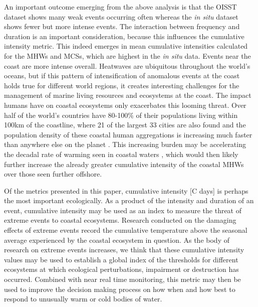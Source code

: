 \documentclass[a4paper,10pt,review]{elsarticle}
\begin{document}
An important outcome emerging from the above analysis is that the OISST dataset shows many weak events occurring often whereas the \emph{in situ} dataset shows fewer but more intense events. The interaction between frequency and duration is an important consideration, because this influences the cumulative intensity metric. This indeed emerges in mean cumulative intensities calculated for the MHWs and MCSs, which are highest in the \emph{in situ} data. Events near the coast are more intense overall. Heatwaves are ubiquitous throughout the world's oceans, but if this pattern of intensification of anomalous events at the coast holds true for different world regions, it creates interesting challenges for the management of marine living resources and ecosystems at the coast. The impact humans have on coastal ecosystems only exacerbates this looming threat. Over half of the world's countries have 80-100\% of their populations living within 100km of the coastline, where 21 of the largest 33 cities are also found and the population density of these coastal human aggregations is increasing much faster than anywhere else on the planet \citep{Martinez2007}. This increasing burden may be accelerating the decadal rate of warming seen in coastal waters \citep{Amos2013}, which would then likely further increase the already greater cumulative intensity of the coastal MHWs over those seen further offshore.

Of the metrics presented in this paper, cumulative intensity [\degree C days] is perhaps the most important ecologically. As a product of the intensity and duration of an event, cumulative intensity may be used as an index to measure the threat of extreme events to coastal ecosystems. Research conducted on the damaging effects of extreme events \citep[e.g.][]{Wernberg2013} record the cumulative temperature above the seasonal average experienced by the coastal ecosystem in question. As the body of research on extreme events increases, we think that these cumulative intensity values may be used to establish a global index of the thresholds for different ecosystems at which ecological perturbations, impairment or destruction has occurred. Combined with near real time monitoring, this metric may then be used to improve the decision making process on how when and how best to respond to unusually warm or cold bodies of water.
\end{document}
